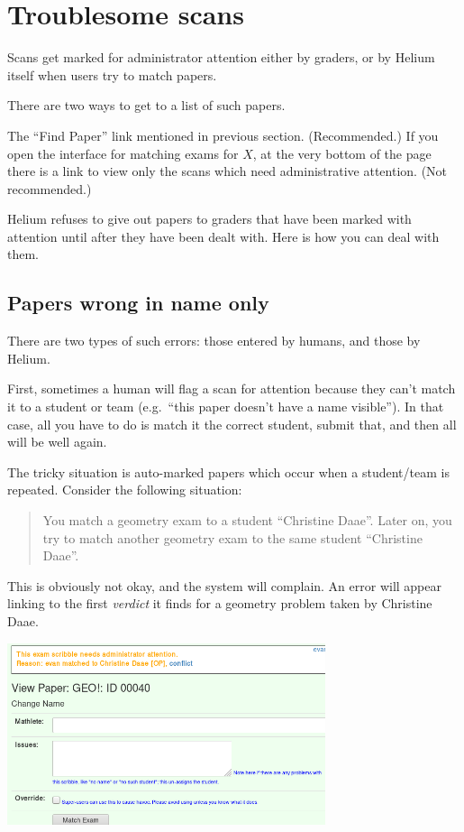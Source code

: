 \section{Troublesome scans}
Scans get marked for administrator attention either by graders,
or by Helium itself when users try to match papers.

There are two ways to get to a list of such papers.
\begin{itemize}
	\ii The ``Find Paper'' link mentioned in previous section. (Recommended.)
	\ii If you open the interface for matching exams for $X$,
	at the very bottom of the page there is a link
	to view only the scans which need administrative attention.
	(Not recommended.)
\end{itemize}
Helium refuses to give out papers to graders
that have been marked with attention until after they have been dealt with.
Here is how you can deal with them.

\subsection{Papers wrong in name only}
There are two types of such errors:
those entered by humans, and those by Helium.

First, sometimes a human will flag a scan for attention
because they can't match it to a student or team
(e.g.\ ``this paper doesn't have a name visible'').
In that case, all you have to do is match it the correct student,
submit that, and then all will be well again.

The tricky situation is auto-marked papers
which occur when a student/team is repeated.
Consider the following situation:
\begin{quote}
	You match a geometry exam to a student ``Christine Daae''.  
	Later on, you try to match another geometry exam
	to the same student ``Christine Daae''.
\end{quote}
This is obviously not okay, and the system will complain.
An error will appear linking to the first \emph{verdict}
it finds for a geometry problem taken by Christine Daae.

\begin{center}
	\includegraphics[width=0.7\textwidth]{images/conflict2.png}
\end{center}


